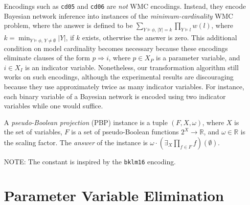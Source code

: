 \documentclass[runningheads]{llncs}
\begin{document}
\begin{remark}
  Encodings such as \texttt{cd05} and \texttt{cd06} are \emph{not} WMC
  encodings. Instead, they encode Bayesian network inference into instances of
  the \emph{minimum-cardinality} WMC problem, where the answer is defined to be
  $\sum_{Y \models \phi\text{, }|Y| = k} \prod_{Y \models l}
  w(l)$, where $k = \min_{Y \models \phi\text{, }Y \ne \emptyset}
  |Y|$, if $k$ exists, otherwise the answer is zero. This additional
  condition on model cardinality becomes necessary because these encodings
  eliminate clauses of the form $p \Rightarrow i$, where $p \in X_P$ is a
  parameter variable, and $i \in X_I$ is an indicator variable. Nonetheless, our
  transformation algorithm still works on such encodings, although the
  experimental results are discouraging because they use approximately twice as
  many indicator variables. For instance, each binary variable of a Bayesian
  network is encoded using two indicator variables while one would suffice.
\end{remark}

\begin{definition} \label{def:new_wmc}
  A \emph{pseudo-Boolean projection} (PBP) instance is a tuple $(F, X, \omega)$,
  where $X$ is the set of variables, $F$ is a set of pseudo-Boolean functions
  $2^X \to \mathbb{R}$, and $\omega \in \mathbb{R}$ is the scaling factor. The
  \emph{answer} of the instance is $\omega \cdot \left(\exists_X\prod_{f \in
      F}f\right)(\emptyset)$.
\end{definition}

NOTE: The constant is inspired by the \texttt{bklm16}
\cite{DBLP:conf/ecai/BartKLM16} encoding.

\section{Parameter Variable Elimination}
\end{document}
